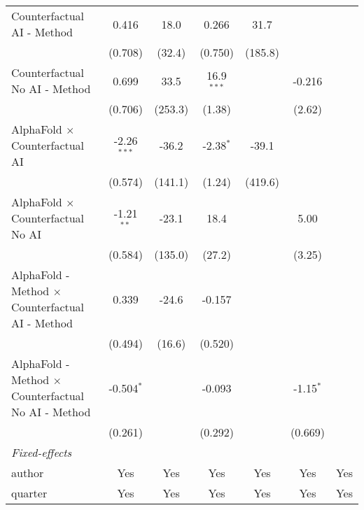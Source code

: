\begin{tabular}{lcccccc}
   Counterfactual AI - Method                                 & 0.416         & 18.0         & 0.266        & 31.7        &              &   \\   
                                                              & (0.708)       & (32.4)       & (0.750)      & (185.8)     &              &   \\   
   Counterfactual No AI - Method                              & 0.699         & 33.5         & 16.9$^{***}$ &             & -0.216       &   \\   
                                                              & (0.706)       & (253.3)      & (1.38)       &             & (2.62)       &   \\   
   AlphaFold $\times$ Counterfactual AI                       & -2.26$^{***}$ & -36.2        & -2.38$^{*}$  & -39.1       &              &   \\   
                                                              & (0.574)       & (141.1)      & (1.24)       & (419.6)     &              &   \\   
   AlphaFold $\times$ Counterfactual No AI                    & -1.21$^{**}$  & -23.1        & 18.4         &             & 5.00         &   \\   
                                                              & (0.584)       & (135.0)      & (27.2)       &             & (3.25)       &   \\   
   AlphaFold - Method $\times$ Counterfactual AI - Method     & 0.339         & -24.6        & -0.157       &             &              &   \\   
                                                              & (0.494)       & (16.6)       & (0.520)      &             &              &   \\   
   AlphaFold - Method $\times$ Counterfactual No AI - Method  & -0.504$^{*}$  &              & -0.093       &             & -1.15$^{*}$  &   \\   
                                                              & (0.261)       &              & (0.292)      &             & (0.669)      &   \\   
   \midrule
   \emph{Fixed-effects}\\
   author                                                     & Yes           & Yes          & Yes          & Yes         & Yes          & Yes\\  
   quarter                                                    & Yes           & Yes          & Yes          & Yes         & Yes          & Yes\\  

\end{tabular}
